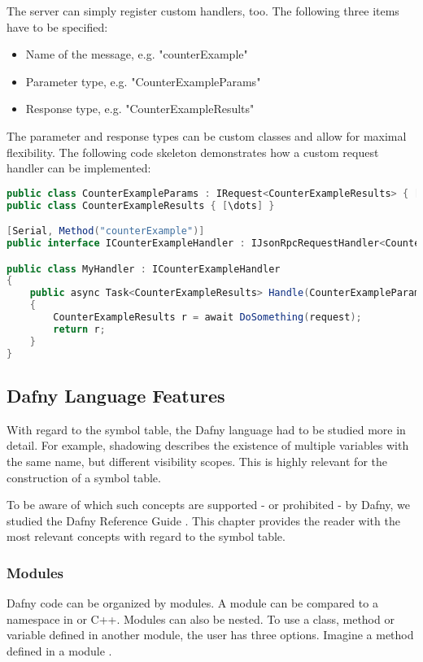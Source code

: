 The server can simply register custom handlers, too. The following three items have to be specified:
\begin{itemize}
    \item Name of the message, e.g. "counterExample"
    \item Parameter type, e.g. "CounterExampleParams"
    \item Response type, e.g. "CounterExampleResults"
\end{itemize}


The parameter and response types can be custom classes and allow for maximal flexibility. The following code skeleton demonstrates how a custom request handler can be implemented:

\begin{lstlisting}[language=csharp, caption={LSP Handler Implementation}, captionpos=b, label={lst:lspcustomhandler}]
public class CounterExampleParams : IRequest<CounterExampleResults> { [\dots] }
public class CounterExampleResults { [\dots] }

[Serial, Method("counterExample")]
public interface ICounterExampleHandler : IJsonRpcRequestHandler<CounterExampleParams, CounterExampleResults> { }

public class MyHandler : ICounterExampleHandler
{
    public async Task<CounterExampleResults> Handle(CounterExampleParams request, CancellationToken c)
    {
        CounterExampleResults r = await DoSomething(request);
        return r;
    }
}
\end{lstlisting}



\subsection{Dafny Language Features}
With regard to the symbol table, the Dafny language had to be studied more in detail. For example, shadowing describes the existence of multiple variables with the same name, but different visibility scopes. This is highly relevant for the construction of a symbol table.

To be aware of which such concepts are supported - or prohibited - by Dafny, we studied the Dafny Reference Guide \cite{dafnyReferenceManual}. This chapter provides the reader with the most relevant concepts with regard to the symbol table.


\subsubsection{Modules}
Dafny code can be organized by modules. A module can be compared to a namespace in \Csharp or C++. Modules can also be nested. To use a class, method or variable defined in another module, the user has three options. Imagine a method  defined in a module .

